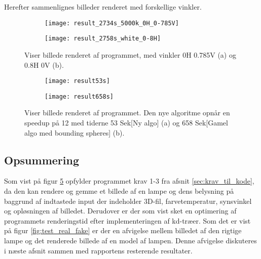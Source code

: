 Herefter sammenlignes billeder renderet med forskellige vinkler.
\begin{figure}[H]
\centering
\begin{subfigure}{.5\textwidth}
  \centering
  \texttt{[image: result\_2734s\_5000k\_0H\_0-785V]}
  \caption{}
  \label{fig:real}
\end{subfigure}%
\begin{subfigure}{.5\textwidth}
  \centering
  \texttt{[image: result\_2758s\_white\_0-8H]}
  \caption{}
  \label{fig:fake}
\end{subfigure}
\caption{Viser billede renderet af programmet, med vinkler 0H 0.785V (a) og 0.8H 0V (b).}
\label{fig:synsvinkel1}
\end{figure}

\begin{figure}[H]
\centering
\begin{subfigure}{.5\textwidth}
  \centering
  \texttt{[image: result53s]}
  \caption{}
  \label{fig:real}
\end{subfigure}%
\begin{subfigure}{.5\textwidth}
  \centering
  \texttt{[image: result658s]}
  \caption{}
  \label{fig:fake}
\end{subfigure}
\caption{Viser billede renderet af programmet. Den nye algoritme opnår en speedup på 12 med tiderne 53 Sek[Ny algo] (a) og 658 Sek[Gamel algo med bounding spheres] (b).}
\label{fig:synsvinkel1}
\end{figure}

\subsection*{Opsummering}
Som vist på figur \ref{fig:fake} opfylder programmet krav 1-3 fra afsnit \ref{sec:krav_til_kode}, da den kan rendere og gemme et billede af en lampe og dens belysning på baggrund af indtastede input der indeholder 3D-fil, farvetemperatur, synsvinkel og opløsningen af billedet. Derudover er der som vist sket en optimering af programmets renderingstid efter implementeringen af kd-træer. 
Som det er vist på figur \ref{fig:test_real_fake} er der en afvigelse mellem billedet af den rigtige lampe og det renderede billede af en model af lampen. Denne afvigelse diskuteres i næste afsnit sammen med rapportens resterende resultater. 

